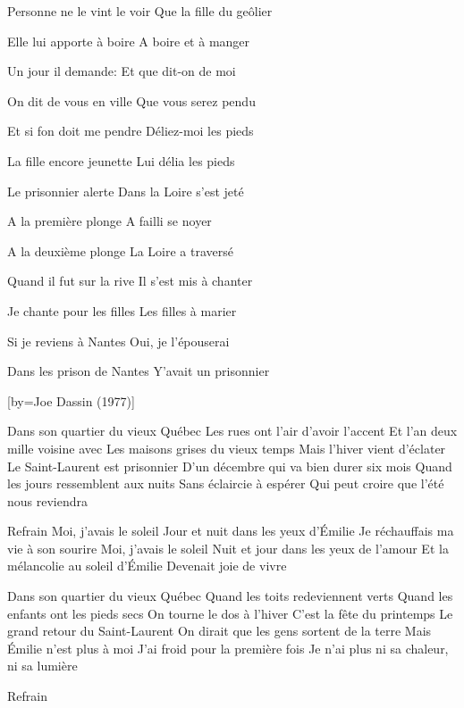 \beginverse
Personne ne le vint le voir
Que la fille du geôlier
\endverse

\beginverse
Elle lui apporte à boire
A boire et à manger
\endverse

\beginverse
Un jour il demande:
\- Et que dit-on de moi
\endverse

\- On dit de vous en ville
Que vous serez pendu

\- Et si fon doit me pendre
Déliez-moi les pieds

\beginverse
La fille encore jeunette
Lui délia les pieds
\endverse

\beginverse
Le prisonnier alerte
Dans la Loire s'est jeté
\endverse

\beginverse
A la première plonge
A failli se noyer
\endverse

\beginverse
A la deuxième plonge
La Loire a traversé
\endverse

\beginverse
Quand il fut sur la rive
Il s'est mis à chanter
\endverse

\beginverse
Je chante pour les filles
Les filles à marier
\endverse

\beginverse
Si je reviens à Nantes
Oui, je l'épouserai 
\endverse

\beginverse
Dans les prison de Nantes 
Y'avait un prisonnier
\endverse

[by={Joe Dassin (1977)}]

\beginverse
Dans son quartier du vieux Québec
Les rues ont l'air d'avoir l'accent
Et l'an deux mille voisine avec
Les maisons grises du vieux temps
Mais l'hiver vient d'éclater
Le Saint-Laurent est prisonnier
D'un décembre qui va bien durer six mois
Quand les jours ressemblent aux nuits
Sans éclaircie à espérer
Qui peut croire que l'été nous reviendra
\endverse

\beginverse
Refrain
Moi, j'avais le soleil
Jour et nuit dans les yeux d'Émilie
Je réchauffais ma vie à son sourire
Moi, j'avais le soleil
Nuit et jour dans les yeux de l'amour
Et la mélancolie au soleil d'Émilie
Devenait joie de vivre
\endverse

\beginverse
Dans son quartier du vieux Québec
Quand les toits redeviennent verts
Quand les enfants ont les pieds secs
On tourne le dos à l'hiver
C'est la fête du printemps
Le grand retour du Saint-Laurent
On dirait que les gens sortent de la terre
Mais Émilie n'est plus à moi
J'ai froid pour la première fois
Je n'ai plus ni sa chaleur, ni sa lumière
\endverse

\beginverse
Refrain
\endverse

